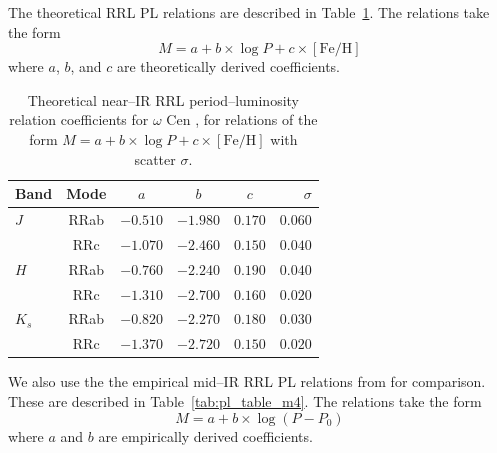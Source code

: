 \documentclass[a4paper,fleqn,usenatbib]{mnras}
\begin{document}
The theoretical RRL PL relations are described in Table~\ref{tab:pl_table_theo}. The relations take the form
\begin{equation}M = a + b\times\log P + c\times[\text{Fe/H}]\end{equation}
where $a$, $b$, and $c$ are theoretically derived coefficients.
\begin{table}
\centering
\caption{Theoretical near--IR RRL period--luminosity relation coefficients for $\omega$ Cen \citep{2015ApJ...808...50M}, for relations of the form $M = a + b \times \log P + c \times [\text{Fe/H}]$ with scatter $\sigma$.}
\label{tab:pl_table_theo}
\begin{tabular}{l||c|c|c|c|r} 
\hline \hline
Band & Mode & $a$   & $b$   & $c$   & $\sigma$ \\
\hline
$J$ & RRab & $-0.510$ & $-1.980$ & $0.170$ & $0.060$ \\
       & RRc & $-1.070$ & $-2.460$ & $0.150$ & $0.040$ \\
$H$ & RRab & $-0.760$ & $-2.240$ & $0.190$ & $0.040$\\
       & RRc & $-1.310$ & $-2.700$ & $0.160$ & $0.020$\\
$K_s$ & RRab & $-0.820$ & $-2.270$ & $0.180$ & $0.030$\\
           & RRc & $-1.370$ & $-2.720$ & $0.150$ & $0.020$ \\       
            \hline
\end{tabular}
\end{table}


We also use the the empirical mid--IR RRL PL relations from \citet{2015arXiv150507858N} for comparison. These are described in Table~\ref{tab:pl_table_m4}. The relations take the form
\begin{equation}M = a + b\times\log (P - P_0) \end{equation}
where $a$ and $b$ are empirically derived coefficients.
\end{document}

